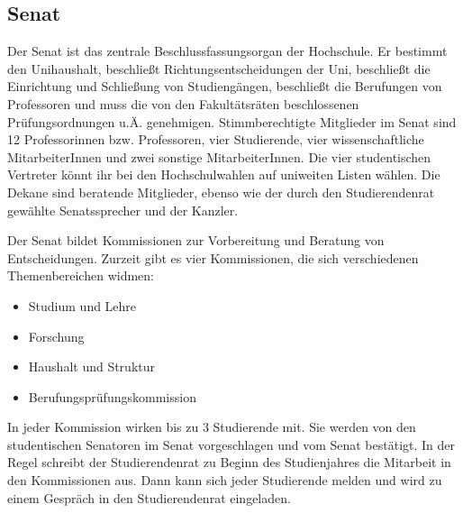 \subsection{Senat}
\label{senat}

Der Senat ist das zentrale Beschlussfassungsorgan der Hochschule.
Er bestimmt den Unihaushalt, beschließt Richtungsentscheidungen der Uni, beschließt die Einrichtung und Schließung von Studiengängen, beschließt die Berufungen von Professoren und muss die von den Fakultätsräten beschlossenen Prüfungsordnungen u.Ä. genehmigen.
Stimmberechtigte Mitglieder im Senat sind 12 Professorinnen bzw. Professoren, vier Studierende, vier wissenschaftliche MitarbeiterInnen und zwei sonstige MitarbeiterInnen.
Die vier studentischen Vertreter könnt ihr bei den Hochschulwahlen auf uniweiten Listen wählen.
Die Dekane sind beratende Mitglieder, ebenso wie der durch den Studierendenrat gewählte Senatssprecher und der Kanzler.

Der Senat bildet Kommissionen zur Vorbereitung und Beratung von Entscheidungen.
Zurzeit gibt es vier Kommissionen, die sich verschiedenen Themenbereichen widmen:

\begin{itemize}
    \item Studium und Lehre
    \item Forschung
    \item Haushalt und Struktur
    \item Berufungsprüfungskommission
\end{itemize}

In jeder Kommission wirken bis zu 3 Studierende mit.
Sie werden von den studentischen Senatoren im Senat vorgeschlagen und vom Senat bestätigt.
In der Regel schreibt der Studierendenrat zu Beginn des Studienjahres die Mitarbeit in den Kommissionen aus.
Dann kann sich jeder Studierende melden und wird zu einem Gespräch in den Studierendenrat eingeladen.


